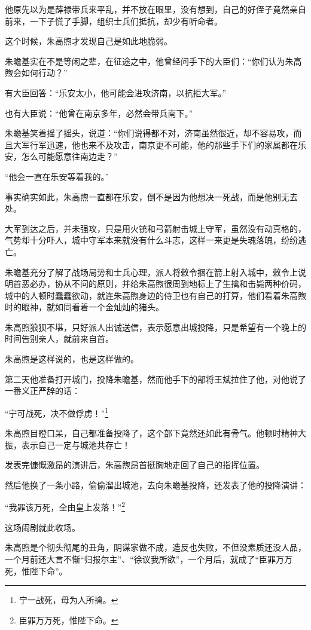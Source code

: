 \begin{multicols}{\theparacolNo}
他原先以为是薛禄带兵来平乱，并不放在眼里，没有想到，自己的好侄子竟然亲自前来，一下子慌了手脚，组织士兵们抵抗，却少有听命者。

这个时候，朱高煦才发现自己是如此地脆弱。

朱瞻基实在不是等闲之辈，在征途之中，他曾经问手下的大臣们：“你们认为朱高煦会如何行动？”

有大臣回答：“乐安太小，他可能会进攻济南，以抗拒大军。”

也有大臣说：“他曾在南京多年，必然会带兵南下。”

朱瞻基笑着摇了摇头，说道：“你们说得都不对，济南虽然很近，却不容易攻，而且大军行军迅速，他也来不及攻击，南京更不可能，他的那些手下们的家属都在乐安，怎么可能愿意往南边走？”

“他会一直在乐安等着我的。”

事实确实如此，朱高煦一直都在乐安，倒不是因为他想决一死战，而是他别无去处。

大军到达之后，并未强攻，只是用火铳和弓箭射击城上守军，虽然没有动真格的，气势却十分吓人，城中守军本来就没有什么斗志，这样一来更是失魂落魄，纷纷逃亡。

朱瞻基充分了解了战场局势和士兵心理，派人将敕令捆在箭上射入城中，敕令上说明首恶必办，协从不问的原则，并给朱高煦很周到地标上了生擒和击毙两种价码，城中的人顿时蠢蠢欲动，就连朱高煦身边的侍卫也有自己的打算，他们看着朱高煦时的眼神，就如同看着一个金灿灿的猪头。

朱高煦狼狈不堪，只好派人出诚送信，表示愿意出城投降，只是希望有一个晚上的时间告别亲人，就前来自首。

朱高煦是这样说的，也是这样做的。

第二天他准备打开城门，投降朱瞻基，然而他手下的部将王斌拉住了他，对他说了一番义正严辞的话：

“宁可战死，决不做俘虏！”\footnote{宁一战死，毋为人所擒。}

朱高煦目瞪口呆，自己都准备投降了，这个部下竟然还如此有骨气。他顿时精神大振，表示自己一定与城池共存亡！

发表完慷慨激昂的演讲后，朱高煦昂首挺胸地走回了自己的指挥位置。

然后他换了一条小路，偷偷溜出城池，去向朱瞻基投降，还发表了他的投降演讲：

“我罪该万死，全由皇上发落！”\footnote{臣罪万万死，惟陛下命。}

这场闹剧就此收场。

朱高煦是个彻头彻尾的丑角，阴谋家做不成，造反也失败，不但没素质还没人品，一个月前还大言不惭“归报尔主”、“徐议我所欲”，一个月后，就成了“臣罪万万死，惟陛下命”。


\end{multicols}
